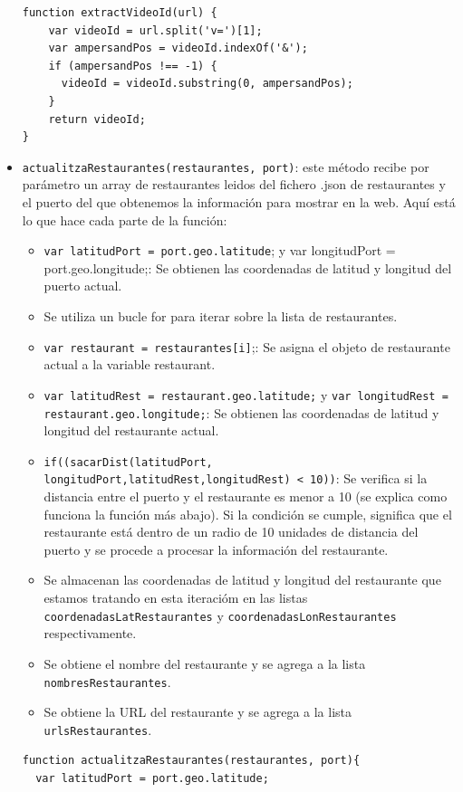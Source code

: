 \documentclass{article}
\begin{document}
\begin{itemize}
\begin{verbatim}
function extractVideoId(url) {
    var videoId = url.split('v=')[1];
    var ampersandPos = videoId.indexOf('&');
    if (ampersandPos !== -1) {
      videoId = videoId.substring(0, ampersandPos);
    }
    return videoId;
}
    \end{verbatim}
    \item \texttt{actualitzaRestaurantes(restaurantes, port)}: este método recibe por parámetro un array de restaurantes leidos del fichero .json de restaurantes y el puerto del que obtenemos la información para mostrar en la web. Aquí está lo que hace cada parte de la función:
    \begin{itemize}
      \item \texttt{var latitudPort = port.geo.latitude}; y var longitudPort = port.geo.longitude;: Se obtienen las coordenadas de latitud y longitud del puerto actual.
      \item Se utiliza un bucle for para iterar sobre la lista de restaurantes.
      \item \texttt{var restaurant = restaurantes[i]};: Se asigna el objeto de restaurante actual a la variable restaurant.
      \item \texttt{var latitudRest = restaurant.geo.latitude;} y \texttt{var longitudRest = restaurant.geo.longitude;}: Se obtienen las coordenadas de latitud y longitud del restaurante actual.
      \item \texttt{if((sacarDist(latitudPort, longitudPort,latitudRest,longitudRest) < 10))}: Se verifica si la distancia entre el puerto y el restaurante es menor a 10 (se explica como funciona la función más abajo). Si la condición se cumple, significa que el restaurante está dentro de un radio de 10 unidades de distancia del puerto y se procede a procesar la información del restaurante.
      \item Se almacenan las coordenadas de latitud y longitud del restaurante que estamos tratando en esta iteracióm en las listas \texttt{coordenadasLatRestaurantes} y \texttt{coordenadasLonRestaurantes} respectivamente.
      \item Se obtiene el nombre del restaurante y se agrega a la lista \texttt{nombresRestaurantes}.
      \item Se obtiene la URL del restaurante y se agrega a la lista \texttt{urlsRestaurantes}.
    \end{itemize}
    \begin{verbatim}
function actualitzaRestaurantes(restaurantes, port){
  var latitudPort = port.geo.latitude;

\end{verbatim}
\end{itemize}
\end{document}
